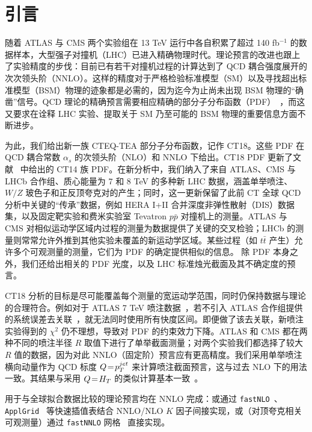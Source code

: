 \section{\label{sec:Introduction} 引言}

随着 ATLAS 与 CMS 两个实验组在 13 TeV 运行中各自积累了超过 140 fb$^{-1}$ 的数据样本，大型强子对撞机（LHC）已进入精确物理时代。理论预言的改进也跟上了实验精度的步伐：目前已有若干对撞机过程的计算达到了 QCD 耦合强度展开的次次领头阶（NNLO）。这样的精度对于严格检验标准模型（SM）以及寻找超出标准模型（BSM）物理的迹象都是必需的，因为迄今为止尚未出现 BSM 物理的``确凿''信号。QCD 理论的精确预言需要相应精确的部分子分布函数（PDF）~\cite{Dulat:2015mca,Harland-Lang:2014zoa,Ball:2017nwa,Alekhin:2017kpj,Accardi:2016qay,Harland-Lang:2019pla,Bertone:2017bme,Manohar:2017eqh}，而这又要求在诠释 LHC 实验、提取关于 SM 乃至可能的 BSM 物理的重要信息方面不断进步。

为此，我们给出新一族 CTEQ-TEA 部分子分布函数，记作 CT18。这些 PDF 在 QCD 耦合常数 $\alpha_s$ 的次领头阶（NLO）和 NNLO 下给出。CT18 PDF 更新了文献~\cite{Dulat:2015mca} 中给出的 CT14 族 PDF。在新分析中，我们纳入了来自 ATLAS、CMS 与 LHCb 合作组、质心能量为 7 和 8 TeV 的多种新 LHC 数据，涵盖单举喷注、$W/Z$ 玻色子和正反顶夸克对的产生；同时，这一更新保留了此前 CT 全球 QCD 分析中关键的``传承''数据，例如 HERA I+II 合并深度非弹性散射（DIS）数据集，以及固定靶实验和费米实验室 Tevatron $p\bar p$ 对撞机上的测量。ATLAS 与 CMS 对相似运动学区域内过程的测量为数据提供了关键的交叉检验；LHCb 的测量则常常允许外推到其他实验未覆盖的新运动学区域。某些过程（如 $t\bar{t}$ 产生）允许多个可观测量的测量，它们为 PDF 的确定提供相似的信息。
除 PDF 本身之外，我们还给出相关的 PDF 光度，以及 LHC 标准烛光截面及其不确定度的预言。

CT18 分析的目标是尽可能覆盖每个测量的宽运动学范围，同时仍保持数据与理论的合理符合。例如对于 ATLAS 7 TeV 喷注数据~\cite{Aad:2014vwa}，若不引入 ATLAS 合作组提供的系统误差去关联~\cite{Aaboud:2017dvo}，就无法同时使用所有快度区间。即便做了该去关联，新喷注实验得到的 $\chi^2$ 仍不理想，导致对 PDF 的约束效力下降。ATLAS 和 CMS 都在两种不同的喷注半径 $R$ 取值下进行了单举截面测量；对两个实验我们都选择了较大 $R$ 值的数据，因为对此 NNLO（固定阶）预言应有更高精度。我们采用单举喷注横向动量作为 QCD 标度 $Q\! =\! p_T^{jet}$ 来计算喷注截面预言，这与过去 NLO 下的用法一致。其结果与采用 $Q\! =\! H_T$ 的类似计算基本一致~\cite{Currie:2016bfm,Currie:2017ctp,Currie:2018xkj}。

用于与全球拟合数据比较的理论预言均在 NNLO 完成：或通过 \texttt{fastNLO}~\cite{Britzger:2012bs,Wobisch:2011ij}、\texttt{ApplGrid}~\cite{Carli:2010rw} 等快速插值表结合 NNLO/NLO $K$ 因子间接实现，或（对顶夸克相关可观测量）通过 \texttt{fastNNLO} 网格~\cite{Czakon:2017dip,fastnnlo:grids} 直接实现。

